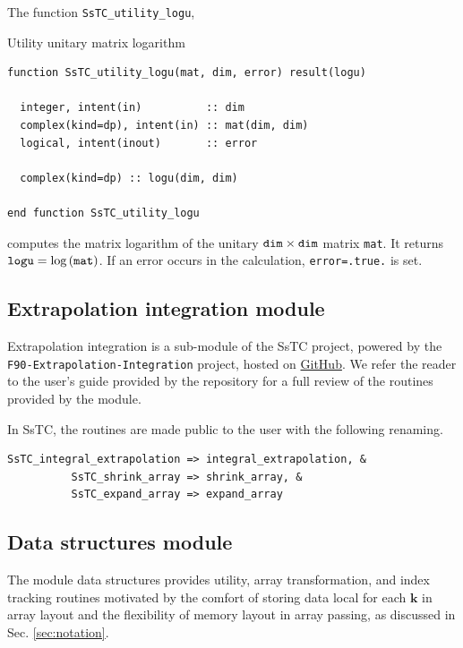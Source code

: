 \documentclass[10pt,a4paper]{article}
\begin{document}
The function \verb|SsTC_utility_logu|,
\begin{codebox}{Utility unitary matrix logarithm}
\begin{lstlisting}[caption={Interface of ``utility logarithm of matrix".},captionpos=b]
function SsTC_utility_logu(mat, dim, error) result(logu)

  integer, intent(in)          :: dim
  complex(kind=dp), intent(in) :: mat(dim, dim)
  logical, intent(inout)       :: error

  complex(kind=dp) :: logu(dim, dim)

end function SsTC_utility_logu
\end{lstlisting}
\end{codebox}
computes the matrix logarithm of the unitary $\verb|dim|\times\verb|dim|$ matrix \verb|mat|. It returns $\verb|logu| = \text{log}\left(\verb|mat|\right)$. If an error occurs in the calculation, \verb|error=.true.| is set.
\subsection{Extrapolation integration module}
Extrapolation integration is a sub-module of the SsTC project, powered by the \\ \verb|F90-Extrapolation-Integration| project, hosted on \href{https://github.com/irukoa/F90-Extrapolation-Integration}{GitHub}. We refer the reader to the user's guide provided by the repository for a full review of the routines provided by the module.

In SsTC, the routines are made public to the user with the following renaming.
\begin{codebox}{}
\begin{lstlisting}[caption={Renaming of extrapolation routines.},captionpos=b]
SsTC_integral_extrapolation => integral_extrapolation, &
          SsTC_shrink_array => shrink_array, &
          SsTC_expand_array => expand_array
\end{lstlisting}
\end{codebox}
\subsection{Data structures module}\label{sec:data_structures}
The module data structures provides utility, array transformation, and index tracking routines motivated by the comfort of storing data local for each $\bm{k}$ in array layout and the flexibility of memory layout in array passing, as discussed in Sec. \ref{sec:notation}.
\end{document}
